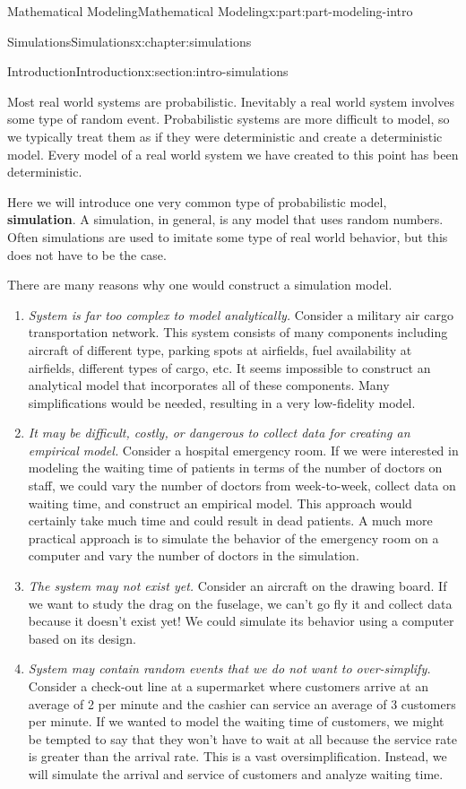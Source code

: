 \documentclass[oneside,10pt,]{book}
\newcommand{\terminology}[1]{\textbf{#1}}
\numberwithin{equation}{section}
\begin{document}
\begin{partptx}{Mathematical Modeling}{}{Mathematical Modeling}{}{}{x:part:part-modeling-intro}
\begin{chapterptx}{Simulations}{}{Simulations}{}{}{x:chapter:simulations}
\begin{sectionptx}{Introduction}{}{Introduction}{}{}{x:section:intro-simulations}
\begin{introduction}{}
Most real world systems are probabilistic. Inevitably a real world system involves some type of random event. Probabilistic systems are more difficult to model, so we typically treat them as if they were deterministic and create a deterministic model. Every model of a real world system we have created to this point has been deterministic.%
\par
Here we will introduce one very common type of probabilistic model, \terminology{simulation}. A simulation, in general, is any model that uses random numbers. Often simulations are used to imitate some type of real world behavior, but this does not have to be the case.%
\par
There are many reasons why one would construct a simulation model.%
%
\begin{enumerate}
\item{}\emph{System is far too complex to model analytically.} Consider a military air cargo transportation network. This system consists of many components including aircraft of different type, parking spots at airfields, fuel availability at airfields, different types of cargo, etc. It seems impossible to construct an analytical model that incorporates all of these components. Many simplifications would be needed, resulting in a very low-fidelity model.%
\item{}\emph{It may be difficult, costly, or dangerous to collect data for creating an empirical model.} Consider a hospital emergency room. If we were interested in modeling the waiting time of patients in terms of the number of doctors on staff, we could vary the number of doctors from week-to-week, collect data on waiting time, and construct an empirical model. This approach would certainly take much time and could result in dead patients. A much more practical approach is to simulate the behavior of the emergency room on a computer and vary the number of doctors in the simulation.%
\item{}\emph{The system may not exist yet.} Consider an aircraft on the drawing board. If we want to study the drag on the fuselage, we can’t go fly it and collect data because it doesn’t exist yet! We could simulate its behavior using a computer based on its design.%
\item{}\emph{System may contain random events that we do not want to over-simplify.} Consider a check-out line at a supermarket where customers arrive at an average of 2 per minute and the cashier can service an average of 3 customers per minute. If we wanted to model the waiting time of customers, we might be tempted to say that they won’t have to wait at all because the service rate is greater than the arrival rate. This is a vast oversimplification. Instead, we will simulate the arrival and service of customers and analyze waiting time.%

\end{enumerate}
\end{introduction}
\end{sectionptx}
\end{chapterptx}
\end{partptx}
\end{document}
